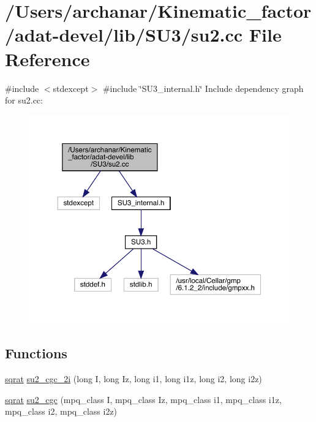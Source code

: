 \hypertarget{adat-devel_2lib_2SU3_2su2_8cc}{}\section{/\+Users/archanar/\+Kinematic\+\_\+factor/adat-\/devel/lib/\+S\+U3/su2.cc File Reference}
\label{adat-devel_2lib_2SU3_2su2_8cc}
{\ttfamily \#include $<$stdexcept$>$}\newline
{\ttfamily \#include \char`\"{}S\+U3\+\_\+internal.\+h\char`\"{}}\newline
Include dependency graph for su2.\+cc\+:
\nopagebreak
\begin{figure}[H]
\begin{center}
\leavevmode
\includegraphics[width=350pt]{df/d5a/adat-devel_2lib_2SU3_2su2_8cc__incl}
\end{center}
\end{figure}
\subsection*{Functions}
\begin{DoxyCompactItemize}
\item 
\mbox{\hyperlink{classsqrat}{sqrat}} \mbox{\hyperlink{adat-devel_2lib_2SU3_2su2_8cc_ae6ace82d1208ded7ef1fc847e1b6dc1b}{su2\+\_\+cgc\+\_\+2i}} (long I, long Iz, long i1, long i1z, long i2, long i2z)
\item 
\mbox{\hyperlink{classsqrat}{sqrat}} \mbox{\hyperlink{adat-devel_2lib_2SU3_2su2_8cc_a391f85ee5656866779d3efe09c992cc4}{su2\+\_\+cgc}} (mpq\+\_\+class I, mpq\+\_\+class Iz, mpq\+\_\+class i1, mpq\+\_\+class i1z, mpq\+\_\+class i2, mpq\+\_\+class i2z)
\end{DoxyCompactItemize}


